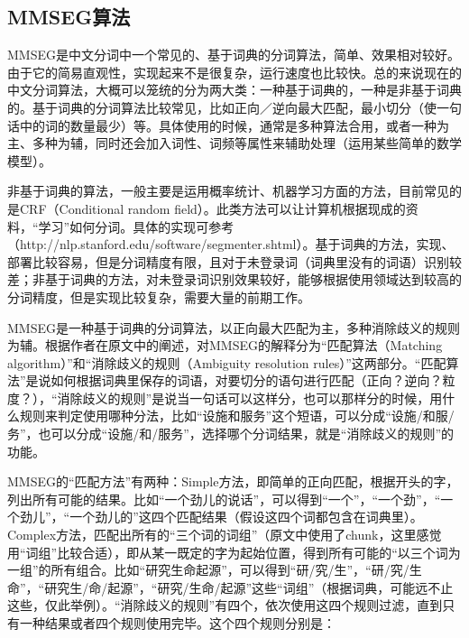 \subsection{MMSEG算法}
\par MMSEG是中文分词中一个常见的、基于词典的分词算法，简单、效果相对较好。由于它的简易直观性，实现起来不是很复杂，运行速度也比较快。总的来说现在的中文分词算法，大概可以笼统的分为两大类：一种基于词典的，一种是非基于词典的。基于词典的分词算法比较常见，比如正向／逆向最大匹配，最小切分（使一句话中的词的数量最少）等。具体使用的时候，通常是多种算法合用，或者一种为主、多种为辅，同时还会加入词性、词频等属性来辅助处理（运用某些简单的数学模型）。
\par 非基于词典的算法，一般主要是运用概率统计、机器学习方面的方法，目前常见的是CRF（Conditional random field）。此类方法可以让计算机根据现成的资料，“学习”如何分词。具体的实现可参考（http://nlp.stanford.edu/software/segmenter.shtml）。基于词典的方法，实现、部署比较容易，但是分词精度有限，且对于未登录词（词典里没有的词语）识别较差；非基于词典的方法，对未登录词识别效果较好，能够根据使用领域达到较高的分词精度，但是实现比较复杂，需要大量的前期工作。
\par MMSEG是一种基于词典的分词算法，以正向最大匹配为主，多种消除歧义的规则为辅。根据作者在原文中的阐述，对MMSEG的解释分为“匹配算法（Matching algorithm）”和“消除歧义的规则（Ambiguity resolution rules）”这两部分。“匹配算法”是说如何根据词典里保存的词语，对要切分的语句进行匹配（正向？逆向？粒度？），“消除歧义的规则”是说当一句话可以这样分，也可以那样分的时候，用什么规则来判定使用哪种分法，比如“设施和服务”这个短语，可以分成“设施/和服/务”，也可以分成“设施/和/服务”，选择哪个分词结果，就是“消除歧义的规则”的功能。
\par MMSEG的“匹配方法”有两种：Simple方法，即简单的正向匹配，根据开头的字，列出所有可能的结果。比如“一个劲儿的说话”，可以得到“一个”，“一个劲”，“一个劲儿”，“一个劲儿的”这四个匹配结果（假设这四个词都包含在词典里）。Complex方法，匹配出所有的“三个词的词组”（原文中使用了chunk，这里感觉用“词组”比较合适），即从某一既定的字为起始位置，得到所有可能的“以三个词为一组”的所有组合。比如“研究生命起源”，可以得到“研/究/生”，“研/究/生命”，“研究生/命/起源”，“研究/生命/起源”这些“词组”（根据词典，可能远不止这些，仅此举例）。“消除歧义的规则”有四个，依次使用这四个规则过滤，直到只有一种结果或者四个规则使用完毕。这个四个规则分别是：
